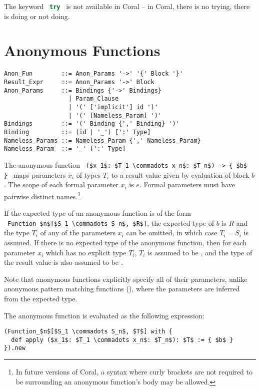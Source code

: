 The keyword ~\lstinline[language=Java]!try!~ is not available in Coral -- in Coral, there is no trying, there is doing or not doing.  





\section{Anonymous Functions}
\label{sec:anonymous-functions}

\syntax\begin{lstlisting}
Anon_Fun        ::= Anon_Params '->' '{' Block '}'
Result_Expr     ::= Anon_Params '->' Block 
Anon_Params     ::= Bindings {'->' Bindings}
                  | Param_Clause
                  | '(' ['implicit'] id ')'
                  | '(' [Nameless_Param] ')'
Bindings        ::= '(' Binding {',' Binding} ')'
Binding         ::= (id | '_') [':' Type]
Nameless_Params ::= Nameless_Param {',' Nameless_Param}
Nameless_Param  ::= '_' [':' Type]
\end{lstlisting}

The anonymous function ~\lstinline!($x_1$: $T_1 \commadots x_n$: $T_n$) -> { $b$ }!~ maps parameters $x_i$ of types $T_i$ to a result value given by evaluation of block $b$. The scope of each formal parameter $x_i$ is $e$. Formal parameters must have pairwise distinct names.\footnote{In future versions of Coral, a syntax where curly brackets are not required to be surrounding an anonymous function's body may be allowed.}

If the expected type of an anonymous function is of the form ~\lstinline!Function_$n$[$S_1 \commadots S_n$, $R$]!, the expected type of $b$ is $R$ and the type $T_i$ of any of the parameters $x_i$ can be omitted, in which case $T_i = S_i$ is assumed. If there is no expected type of the anonymous function, then for each parameter $x_i$ which has no explicit type $T_i$, $T_i$ is assumed to be , and the type of the result value is also assumed to be . 

Note that anonymous functions explicitly specify all of their parameters, unlike anonymous pattern matching functions (), where the parameters are inferred from the expected type. 

The anonymous function is evaluated as the following expression:
\begin{lstlisting}
(Function_$n$[$S_1 \commadots S_n$, $T$] with {
  def apply ($x_1$: $T_1 \commadots x_n$: $T_n$): $T$ := { $b$ }
}).new
\end{lstlisting}

